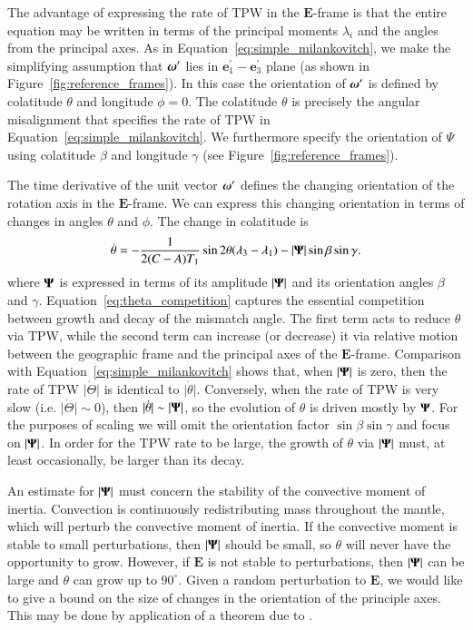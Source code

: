 \documentclass[preprint,12pt,authoryear]{elsarticle}
\newcommand{\mitbf}[1]{\hbox{\mathversion{bold}$#1$}}
\begin{document}
The advantage of expressing the rate of TPW in the $\mathbf{E}$-frame is that the entire equation
may be written in terms of the principal moments $\lambda_i$ and the angles from the principal axes.
As in Equation~\eqref{eq:simple_milankovitch}, we make the simplifying assumption that 
$\mitbf{\omega}^{\prime}$ lies in $\mathbf{e}_1^{\prime}-\mathbf{e}_3^{\prime} $ plane (as shown in Figure~\ref{fig:reference_frames}). 
In this case the orientation of $\mitbf{\omega}^\prime$ is defined by colatitude $\theta$ and longitude $\phi=0$. 
The colatitude $\theta$ is precisely the angular misalignment that specifies the rate of TPW in Equation~\eqref{eq:simple_milankovitch}.
We furthermore specify the orientation of $\Psi$
using colatitude $\beta$ and longitude $\gamma$ (see Figure~\ref{fig:reference_frames}).

The time derivative of the unit vector $\mitbf{\omega}^{\prime}$ defines the changing orientation of the rotation axis in the $\mathbf{E}$-frame. 
We can express this changing orientation in terms of changes in angles $\theta$ and $\phi$. The change in colatitude is
\begin{equation}
\dot{\theta} = 
-\frac{1}{2(C-A) T_1}\sin{2\theta} ( \lambda_3 - \lambda_1) - \vert \mitbf{\Psi} \vert \sin\beta \sin\gamma.
\label{eq:theta_competition}
\end{equation}
where $\mitbf{\Psi}$ is expressed in terms of its amplitude $|\mitbf{\Psi}|$ and its orientation angles $\beta$ and $\gamma$.
Equation~\eqref{eq:theta_competition} captures the essential competition between growth and decay of the mismatch angle.
The first term acts to reduce $\theta$ via TPW, while the second term can increase (or decrease) it via
relative motion between the geographic frame and the principal axes of the $\mathbf{E}$-frame.
Comparison with Equation~\eqref{eq:simple_milankovitch} shows that, when $\vert \mitbf{\Psi} \vert$ is zero,
then the rate of TPW $\vert \dot{\Theta} \vert$ is identical to $\vert \dot{\theta} \vert$.
Conversely, when the rate of TPW is very slow (i.e. $\vert \dot{\Theta} \vert \sim 0$), 
then $\vert \dot{\theta} \vert \sim \vert \mitbf{\Psi} \vert$, so the evolution of $\theta$ is driven mostly by $\mitbf{\Psi}$. 
For the purposes of scaling we will omit the orientation factor $\sin \beta \sin \gamma$ and focus on $|\mitbf{\Psi}|$.
In order for the TPW rate to be large, the growth of $\theta$ via $\vert \mitbf{\Psi} \vert$ must, 
at least occasionally, be larger than its decay.

An estimate for $\vert \mitbf{\Psi} \vert$ must concern the stability of the convective moment of inertia. 
Convection is continuously redistributing mass throughout the mantle, which will perturb the convective moment of inertia.  
If the convective moment is stable to small perturbations, then $\vert \mitbf{\Psi} \vert$ should be small, so
 $\theta$ will never have the opportunity to grow.
However, if $\mathbf{E}$ is not stable to perturbations, then $|\mitbf{\Psi}|$ can be large and $\theta$ can grow up to $90^\circ$. 
Given a random perturbation to $\mathbf{E}$, we would like to give a bound on the size of changes in the orientation of the principle axes. 
This may be done by application of a theorem due to \citet{davis1970rotation}.
\end{document}

